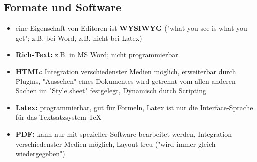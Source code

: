 \documentclass[12pt,landscape]{article}
\begin{document}
\begin{multicols}{3}
\subsection{Formate und Software}
\begin{itemize}
\item eine Eigenschaft von Editoren ist \textbf{WYSIWYG} ("what you see is what you get"; z.B. bei Word, z.B. nicht bei Latex)
\item \textbf{Rich-Text:} z.B. in MS Word; nicht programmierbar
\item \textbf{HTML:} Integration verschiedenster Medien möglich, erweiterbar durch Plugins, "Aussehen" eines Dokumentes wird getrennt vom allen anderen Sachen im "Style sheet" festgelegt, Dynamisch durch Scripting 
\item \textbf{Latex:} programmierbar, gut für Formeln, Latex ist nur die Interface-Sprache für das Textsatzsystem TeX 
\item \textbf{PDF:} kann nur mit spezieller Software bearbeitet werden, Integration verschiedenster Medien möglich, Layout-treu ("wird immer gleich wiedergegeben")
\end{itemize}



\end{multicols}
\end{document}
